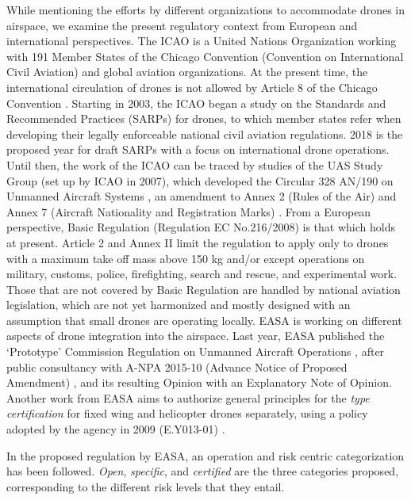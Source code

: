 While mentioning the efforts by different organizations to accommodate drones in airspace, we examine the present regulatory context from European and international perspectives.
The ICAO is a United Nations Organization working with 191 Member States of the Chicago Convention (Convention on International Civil Aviation) and global aviation organizations. 
At the present time, the international circulation of drones is not allowed by Article 8 of the Chicago Convention \cite{chicagoConvention}. 
Starting in 2003, the ICAO began a study on the Standards and Recommended Practices (SARPs) for drones, to which member states refer when developing their legally enforceable national civil aviation regulations. 
2018 is the proposed year for draft SARPs with a focus on international drone operations. 
Until then, the work of the ICAO can be traced by studies of the UAS Study Group (set up by ICAO in 2007), which developed the Circular 328 AN/190 on Unmanned Aircraft Systems \cite{ICAO_Circular}, an amendment to Annex 2 (Rules of the Air) \cite{amendment43toAnnex2} and Annex 7 (Aircraft Nationality and Registration Marks) \cite{amendment6toAnnex6}.
From a European perspective, Basic Regulation (Regulation EC No.216/2008) \cite{basicRegulation} is that which holds at present. 
Article 2 and Annex II limit the regulation to apply only to drones with a maximum take off mass above 150 kg and/or except operations on military, customs, police, firefighting, search and rescue, and experimental work. 
Those that are not covered by Basic Regulation are handled by national aviation legislation, which are not yet harmonized and mostly designed with an assumption that small drones are operating locally.
EASA is working on different aspects of drone integration into the airspace. 
Last year, EASA published the `Prototype' Commission Regulation on Unmanned Aircraft Operations \cite{prototypeRegulation}, after public consultancy with A-NPA 2015-10 (Advance Notice of Proposed Amendment) \cite{A_NPA_EASA2015}, and its resulting Opinion \cite{technicalOpinion} with an Explanatory Note of Opinion. 
Another work from EASA aims to authorize general principles for the \emph{type certification} for fixed wing and helicopter drones separately, using a policy adopted by the agency in 2009 (E.Y013-01) \cite{EY013_01policyStatementAirworthinessCertification}.

In the proposed regulation by EASA, an operation and risk centric categorization has been followed. 
\emph{Open}, \emph{specific}, and \emph{certified} are the three categories proposed, corresponding to the different risk levels that they entail.

